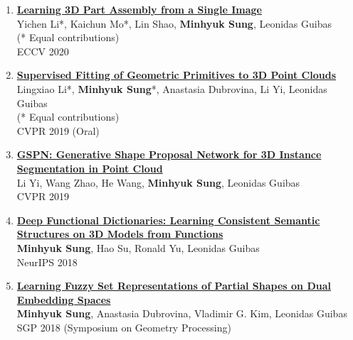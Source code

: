 \documentclass[letterpaper,10pt]{article} %
\newcommand{\blankline}{\quad\pagebreak[2]}
\begin{document}
\begin{enumerate}
\item \label{eccv20_1}
\href{https://cs.stanford.edu/~kaichun/impartass/}{\textbf{Learning 3D Part Assembly from a Single Image}}\\
Yichen Li*, Kaichun Mo*, Lin Shao, \textbf{Minhyuk Sung}, Leonidas Guibas\\
(* Equal contributions)\\
ECCV 2020\\
\blankline

\item \label{cvpr19_2}
\href{https://arxiv.org/abs/1811.08988}{\textbf{Supervised Fitting of Geometric Primitives to 3D Point Clouds}}\\
Lingxiao Li*, \textbf{Minhyuk Sung}*, Anastasia Dubrovina, Li Yi, Leonidas Guibas\\
(* Equal contributions)\\
CVPR 2019 (Oral)\\
\blankline

\item \label{cvpr19_1}
\href{https://arxiv.org/abs/1812.03320}{\textbf{GSPN: Generative Shape Proposal Network for 3D Instance Segmentation in Point Cloud}}\\
Li Yi, Wang Zhao, He Wang, \textbf{Minhyuk Sung}, Leonidas Guibas\\
CVPR 2019\\
\blankline

\item \label{neurips18}
\href{https://arxiv.org/abs/1805.09957}{\textbf{Deep Functional Dictionaries: Learning Consistent Semantic Structures on 3D Models from Functions}}\\
\textbf{Minhyuk Sung}, Hao Su, Ronald Yu, Leonidas Guibas\\
NeurIPS 2018\\
\blankline

\item \label{sgp18}
\href{https://mhsung.github.io/fuzzy-set-dual}{\textbf{Learning Fuzzy Set Representations of Partial Shapes on Dual Embedding Spaces}}\\
\textbf{Minhyuk Sung}, Anastasia Dubrovina, Vladimir G. Kim, Leonidas Guibas\\
SGP 2018 (Symposium on Geometry Processing)\\
\blankline


\end{enumerate}
\end{document}
